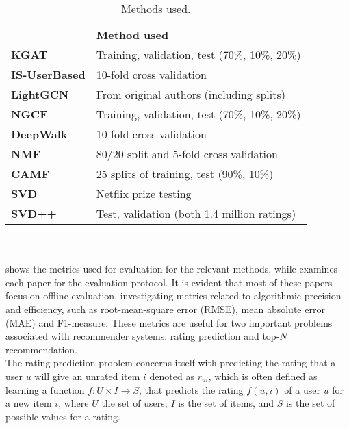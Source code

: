 \begin{table}[]\centering
    \caption{Methods used.}\label{tab:methodsused}
    \scriptsize
    \begin{tabular}{ll}\toprule
        &\textbf{Method used}\\\cmidrule{1-2}
        \textbf{KGAT\cite{KGAT}} & Training, validation, test (70\%, 10\%, 20\%) \\\cmidrule{1-2}
        \textbf{IS-UserBased\cite{GraphBasedCollaborativePaper}} & 10-fold cross validation  \\\cmidrule{1-2}
        \textbf{LightGCN\cite{LightGCN}} & From original authors (including splits) \\\cmidrule{1-2}
        \textbf{NGCF\cite{NGCF} } & Training, validation, test (70\%, 10\%, 20\%) \\\cmidrule{1-2}
        \textbf{DeepWalk\cite{DeepWalk}} & 10-fold cross validation \\\cmidrule{1-2}
        \textbf{NMF\cite{NMF} } & 80/20 split and 5-fold cross validation \\\cmidrule{1-2}
        \textbf{CAMF\cite{baltrunasCAMF} } & 25 splits of training, test (90\%, 10\%) \\\cmidrule{1-2}
        \textbf{SVD\cite{standardMF} } & Netflix prize testing \\\cmidrule{1-2}
        \textbf{SVD++\cite{svd++} } & Test, validation (both 1.4 million ratings) \\\cmidrule{1-2}
    \bottomrule
    \end{tabular}
\end{table}
\\\\
 shows the metrics used for evaluation for the relevant methods, while  examines each paper for the evaluation protocol.
It is evident that most of these papers focus on offline evaluation, investigating metrics related to algorithmic precision and efficiency, such as root-mean-square error (RMSE), mean absolute error (MAE) and F1-measure.
These metrics are useful for two important problems associated with recommender systems: rating prediction and top-$N$ recommendation\cite{RecommenderHandbook2015}.
\\
The rating prediction problem concerns itself with predicting the rating that a user $u$ will give an unrated item $i$ denoted as $r_{ui}$, which is often defined as learning a function $f : U \times I \rightarrow S$, that predicts the rating $f(u, i)$ of a user $u$ for a new item $i$, where $U$ the set of users, $I$ is the set of items, and $S$ is the set of possible values for a rating.
